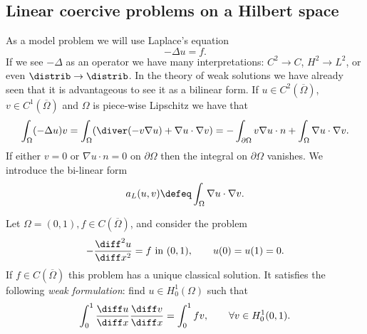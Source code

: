 \subsection{Linear coercive problems on a Hilbert space}
\label{sec:Galerkin linear problems Hilbert space}

As a model problem we will use Laplace's equation
\begin{equation*}
    -\Delta u = f.
\end{equation*}
If we see $-\Delta$ as an operator we have many interpretations: $C^2 \to C$, $H^2 \to L^2$, or even $\distrib \to \distrib$. In the theory of weak solutions we have already seen that it is advantageous to see it as a bilinear form.
If $u \in C^2(\overline \Omega)$, $v \in C^1(\overline \Omega)$ and $\Omega$ is piece-wise Lipschitz we have that
\begin{equation*}
    \int_\Omega (-\Delta u) v = \int_\Omega ( \diver(- v \nabla u ) + \nabla u \cdot \nabla v ) = -\int_{\partial \Omega} v \nabla u \cdot n + \int_\Omega \nabla u \cdot \nabla v.
\end{equation*}
If either $v = 0$ or $\nabla u \cdot n = 0 $ on $\partial \Omega$ then the integral on $\partial \Omega$ vanishes.
We introduce the bi-linear form
\begin{equation*}
    a_{L}(u,v) \defeq \int_\Omega \nabla u \cdot \nabla v.
\end{equation*}
\begin{example}
    \label{ex:Galerkin Laplace d=1}
    Let $\Omega = (0,1), f \in C(\overline \Omega)$, and consider the problem
    \begin{equation*}
        -\frac{\diff^2 u}{\diff x^2} = f \text{ in } (0,1), \qquad u(0) = u(1) = 0.
    \end{equation*}
    If $f \in C(\overline \Omega)$ this problem has a unique classical solution.
    It satisfies the following \emph{weak formulation}: find $u \in H_0^1 (\Omega)$ such that
    \begin{equation*}
        \int_{0}^1 \frac{\diff u}{\diff x} \frac{\diff v}{\diff x} = \int_0^1 f v, \qquad \forall v \in H_0^1 (0,1).
    \end{equation*}
\end{example}

